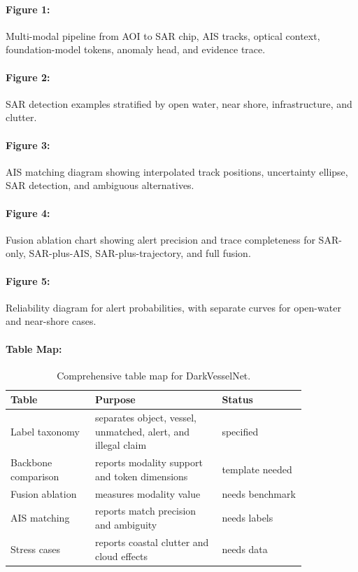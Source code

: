 \documentclass{article}
\begin{document}
\paragraph{Figure 1:}
Multi-modal pipeline from AOI to SAR chip, AIS tracks, optical context, foundation-model tokens, anomaly head, and evidence trace.

\paragraph{Figure 2:}
SAR detection examples stratified by open water, near shore, infrastructure, and clutter.

\paragraph{Figure 3:}
AIS matching diagram showing interpolated track positions, uncertainty ellipse, SAR detection, and ambiguous alternatives.

\paragraph{Figure 4:}
Fusion ablation chart showing alert precision and trace completeness for SAR-only, SAR-plus-AIS, SAR-plus-trajectory, and full fusion.

\paragraph{Figure 5:}
Reliability diagram for alert probabilities, with separate curves for open-water and near-shore cases.

\paragraph{Table Map:}

\begin{table}[t]
\centering
\caption{Comprehensive table map for DarkVesselNet.}
\begin{tabular}{@{}p{0.24\linewidth}p{0.36\linewidth}p{0.24\linewidth}@{}}
\toprule
\textbf{Table} & \textbf{Purpose} & \textbf{Status}\\
\midrule
Label taxonomy & separates object, vessel, unmatched, alert, and illegal claim & specified\\
Backbone comparison & reports modality support and token dimensions & template needed\\
Fusion ablation & measures modality value & needs benchmark\\
AIS matching & reports match precision and ambiguity & needs labels\\
Stress cases & reports coastal clutter and cloud effects & needs data\\
\bottomrule
\end{tabular}
\end{table}
\end{document}
